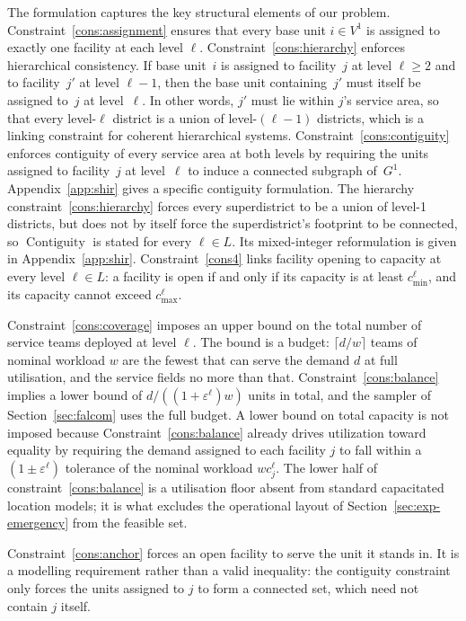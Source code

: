 \documentclass[preprint,12pt,authoryear]{elsarticle}
\theoremstyle{definition}
\DeclareMathOperator{\Contiguity}{Contiguity}  %
\begin{document}
The formulation captures the key structural elements of our problem.
Constraint~\eqref{cons:assignment} ensures that every base unit $i \in V^1$ is
assigned to exactly one facility at each level $\ell$. Constraint~\eqref{cons:hierarchy} 
enforces hierarchical consistency. If base unit~$i$ is assigned to facility~$j$ 
at level $\ell \geq 2$ and to facility~$j'$ at level $\ell - 1$, then the base unit 
containing~$j'$ must itself be assigned to~$j$ at level~$\ell$. In other words, 
$j'$ must lie within $j$'s service area, so that every level-$\ell$ district is 
a union of level-$(\ell{-}1)$ districts, which is a linking constraint for 
coherent hierarchical systems. Constraint~\eqref{cons:contiguity} enforces 
contiguity of every service area at both levels by requiring the units assigned 
to facility~$j$ at level~$\ell$ to induce a connected subgraph of~$G^1$. 
Appendix~\ref{app:shir} gives a specific contiguity formulation.
The hierarchy constraint~\eqref{cons:hierarchy} forces every
superdistrict to be a union of level-1 districts, but does not by
itself force the superdistrict's footprint to be connected, so
$\Contiguity$ is stated for every $\ell \in L$. Its mixed-integer
reformulation is given in Appendix~\ref{app:shir}.
Constraint~\eqref{cons4} links facility opening to capacity at 
every level $\ell \in L$: a facility is open if and only if its 
capacity is at least $c^\ell_{\min}$, and its capacity cannot exceed 
$c^\ell_{\max}$.

Constraint~\eqref{cons:coverage} imposes an upper bound on the total number of service teams deployed at level $\ell$. The bound is a budget: $\lceil d/w \rceil$ teams of nominal workload $w$ are the fewest that can serve the demand $d$ at full utilisation, and the service fields no more than that. Constraint~\eqref{cons:balance} implies a lower bound of $d/((1+\varepsilon^\ell)w)$ units in total, and the sampler of Section~\ref{sec:falcom} uses the full budget. A lower bound on total capacity is not imposed because Constraint~\eqref{cons:balance} already drives utilization
toward equality by requiring the demand assigned to each facility $j$ to fall within a $(1 \pm \varepsilon^{\ell})$ tolerance of the nominal workload $w c^\ell_j$. The lower half of constraint~\eqref{cons:balance} is a utilisation floor absent from standard capacitated location models; it is what excludes the operational layout of Section~\ref{sec:exp-emergency} from the feasible set.  

Constraint~\eqref{cons:anchor} forces an open facility to serve the unit it stands in. It is a modelling requirement rather than a valid inequality: the contiguity constraint only forces the units assigned to $j$ to form a connected set, which need not contain $j$ itself.
\end{document}
